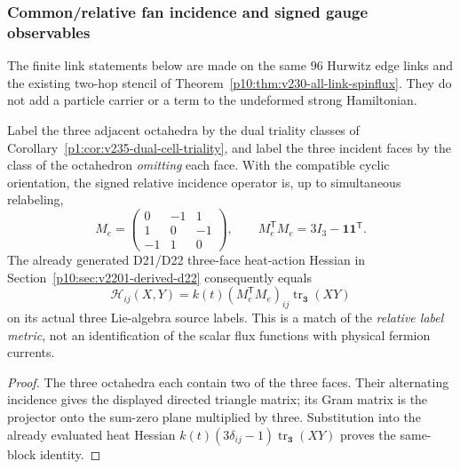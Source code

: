 \documentclass[12pt,a4paper]{article}
\begin{document}
\subsubsection{Common/relative fan incidence and signed gauge observables}
\label{p10:sec:v235-signed-hurwitz-fan}
The finite link statements below are made on the same \(96\)
Hurwitz edge links and the existing two-hop stencil of
Theorem~\ref{p10:thm:v230-all-link-spinflux}.  They do not add a
particle carrier or a term to the undeformed strong Hamiltonian.

\begin{proposition}
\label{p10:prop:v235-triality-relative-source}
Label the three adjacent octahedra by the dual triality classes of
Corollary~\ref{p1:cor:v235-dual-cell-triality}, and label the three
incident faces by the class of the octahedron \emph{omitting} each
face.  With the compatible cyclic orientation, the signed relative
incidence operator is, up to simultaneous relabeling,
\[
 M_e=\begin{pmatrix}0&-1&1\\1&0&-1\\-1&1&0\end{pmatrix},
 \qquad M_e^{\mathsf T}M_e=3I_3-\mathbf1\mathbf1^{\mathsf T}.
\]
The already generated D21/D22 three-face heat-action Hessian in
Section~\ref{p10:sec:v2201-derived-d22} consequently equals
\[
 \mathcal H_{ij}(X,Y)=
 k(t)(M_e^{\mathsf T}M_e)_{ij}\operatorname{tr}_{\mathbf3}(XY)
\]
on its actual three Lie-algebra source labels.  This is a match of
the \emph{relative label metric}, not an identification of the
scalar flux functions with physical fermion currents.
\end{proposition}
\begin{proof}
The three octahedra each contain two of the three faces.  Their
alternating incidence gives the displayed directed triangle matrix;
its Gram matrix is the projector onto the sum-zero plane multiplied
by three.  Substitution into the already evaluated heat Hessian
\(k(t)(3\delta_{ij}-1)\operatorname{tr}_{\mathbf3}(XY)\)
proves the same-block identity.
\end{proof}
\end{document}

